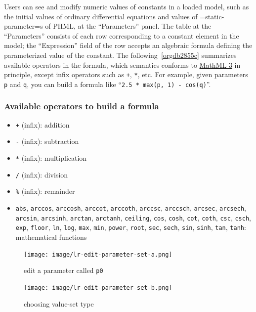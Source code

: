 \documentclass[a4paper,10pt]{report}
\begin{document}
Users can see and modify numeric values of constants in a loaded model,
such as the initial values of ordinary differential equations and values of
=static-parameter=s of PHML, at the ``Parameters'' panel.
The table at the ``Parameters'' consists of each row corresponding to a constant
element in the model; the ``Expression'' field of the row accepts an algebraic
formula defining the parameterized value of the constant.
The following~\ref{orgdb2855c} summarizes available operators in
the formula, which semantics conforms to \href{https://www.w3.org/TR/MathML3/}{MathML 3} in principle,
except infix operators such as \texttt{+}, \texttt{*}, etc.
For example, given parameters \texttt{p} and \texttt{q}, you can build a formula
like ``\texttt{2.5 * max(p, 1) - cos(q)}''.

\subsubsection{\label{orgdb2855c}Available operators to build a formula}
\label{sec:org338128c}


\begin{itemize}
\item \texttt{+} (infix): addition
\item \texttt{-} (infix): subtraction
\item \texttt{*} (infix): multiplication
\item \texttt{/} (infix): division
\item \texttt{\%} (infix): remainder
\item \texttt{abs},
\texttt{arccos},
\texttt{arccosh},
\texttt{arccot},
\texttt{arccoth},
\texttt{arccsc},
\texttt{arccsch},
\texttt{arcsec},
\texttt{arcsech},
\texttt{arcsin},
\texttt{arcsinh},
\texttt{arctan},
\texttt{arctanh},
\texttt{ceiling},
\texttt{cos},
\texttt{cosh},
\texttt{cot},
\texttt{coth},
\texttt{csc},
\texttt{csch},
\texttt{exp},
\texttt{floor},
\texttt{ln},
\texttt{log},
\texttt{max},
\texttt{min},
\texttt{power},
\texttt{root},
\texttt{sec},
\texttt{sech},
\texttt{sin},
\texttt{sinh},
\texttt{tan},
\texttt{tanh}: mathematical functions
\end{itemize}

\begin{figure}[htbp]
\centering
\texttt{[image: image/lr-edit-parameter-set-a.png]}
\caption{\label{fig:org20e330d}edit a parameter called \texttt{p0}}
\end{figure}
\begin{figure}[htbp]
\centering
\texttt{[image: image/lr-edit-parameter-set-b.png]}
\caption{\label{fig:org6d01767}choosing value-set type}
\end{figure}
\end{document}
